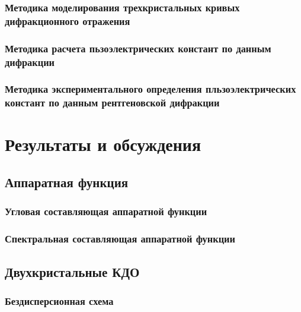 \documentclass[pdftex,a4paper,14pt,english,russian]{extarticle}
\numberwithin{equation}{subsection}
\newcounter{subsubsubsection}[subsubsection]
\begin{document}
    \subsubsection{Методика моделирования трехкристальных кривых дифракционного отражения}
        
        
    \subsubsection{Методика расчета пьзоэлектрических констант по данным дифракции}
      
      \subsubsection{Методика экспериментального определения
      пльзоэлектрических констант по данным рентгеновской дифракции}
            
            


\newpage
\section{Результаты и обсуждения}
  \subsection{Аппаратная функция}
  \subsubsection{Угловая составляющая аппаратной функции}
    
  \subsubsection{Спектральная составляющая аппаратной функции}
      
  \subsection{Двухкристальные КДО}

    \subsubsection{Бездисперсионная схема}
    
\end{document}

